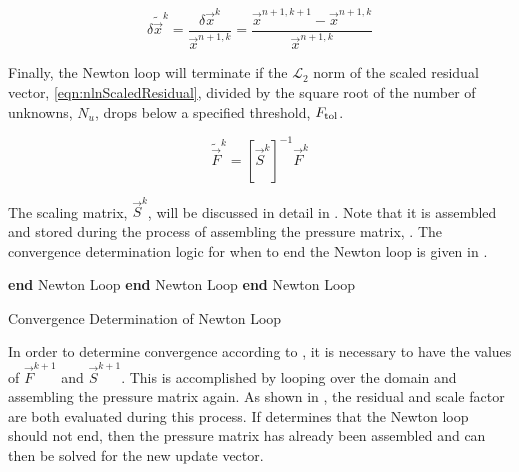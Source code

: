 \begin{equation}
\label{eqn:nlnUpdateVector}
\delta \tilde{\vec{x}}^{k} = \frac{\delta \vec{x}^{k}}{\vec{x}^{n+1, k}} = \frac{ \vec{x}^{n+1, k+1} - \vec{x}^{n+1, k}}{\vec{x}^{n+1,k}}
\end{equation}

Finally, the Newton loop will terminate if the $\mathcal{L}_{2}$ norm of the scaled residual vector, \eqref{eqn:nlnScaledResidual}, divided by the square root of the number of unknowns, $N_{u}$, drops below a specified threshold, $\ftol{}$.

\begin{equation}
\label{eqn:nlnScaledResidual}
\tilde{\vec{F}}^{k} = \left[\vec{S}^{k}\right]^{-1}\vec{F}^{k}
\end{equation}

The scaling matrix, $\vec{S}^{k}$, will be discussed in detail in .
Note that it is assembled and stored during the process of assembling the pressure matrix, .
The convergence determination logic for when to end the Newton loop is given in .

\begin{algo}[ht!]
\setlength{\baselineskip}{0.625\baselineskip}
\begin{algorithmic}[1]
	\State \textbf{end} Newton Loop
	\State \textbf{end} Newton Loop
	\State \textbf{end} Newton Loop
\EndIf
\end{algorithmic}
\caption{Convergence Determination of Newton Loop}
\label{alg:nlnConvergence}
\end{algo}

In order to determine convergence according to , it is necessary to have the values of $\vec{F}^{k+1}$ and $\vec{S}^{k+1}$.
This is accomplished by looping over the domain and assembling the pressure matrix again.
As shown in , the residual and scale factor are both evaluated during this process.
If  determines that the Newton loop should not end, then the pressure matrix has already been  assembled and can then be solved for the new update vector.

